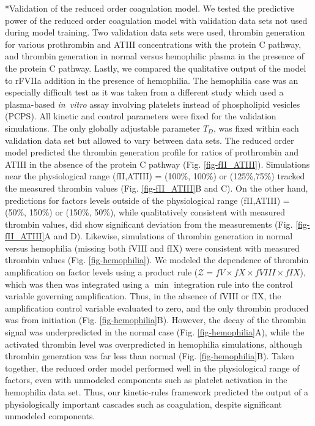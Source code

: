 \documentclass[12pt]{article}
\makeatletter
\renewcommand\subsection{\@startsection
	{subsection}{2}{0mm}
	{-0.05in}
	{-0.5\baselineskip}
	{\normalfont\normalsize\bfseries}}
\makeatother
\begin{document}
\subsection*{Validation of the reduced order coagulation model.}
We tested the predictive power of the reduced order coagulation model with validation data sets not used during model training. 
Two validation data sets were used, thrombin generation for various prothrombin and ATIII concentrations with the protein C pathway, 
and thrombin generation in normal versus hemophilic plasma in the presence of the protein C pathway. 
Lastly, we compared the qualitative output of the model to rFVIIa addition in the presence of hemophilia.
The hemophilia case was an especially difficult test as it was taken from a different study which used a plasma-based
\textit{in~vitro} assay involving platelets instead of phospholipid vesicles (PCPS). 
All kinetic and control parameters were fixed for the validation simulations. 
The only globally adjustable parameter $T_{D}$, was fixed within each validation data set but allowed to vary between data sets.
The reduced order model predicted the thrombin generation profile for ratios of prothrombin and ATIII in the absence of the protein C pathway (Fig. \ref{fig-fII_ATIII}).
Simulations near the physiological range (fII,ATIII) = (100\%, 100\%) or (125\%,75\%) tracked the measured thrombin values (Fig. \ref{fig-fII_ATIII}B and C).
On the other hand, predictions for factors levels outside of the physiological range (fII,ATIII) = (50\%, 150\%) or (150\%, 50\%), while qualitatively consistent with measured thrombin values, did show significant 
deviation from the measurements (Fig. \ref{fig-fII_ATIII}A and D).
Likewise, simulations of thrombin generation in normal versus hemophilia (missing both fVIII and fIX) were consistent with measured thrombin values (Fig. \ref{fig-hemophilia}).
We modeled the dependence of thrombin amplification on factor levels using a product rule ($\mathcal{Z} = fV\times fX\times fVIII\times fIX$), 
which was then was integrated using a $\min$ integration rule into the control variable governing amplification. 
Thus, in the absence of fVIII or fIX, the amplification control variable evaluated to zero, and the only thrombin produced was from initiation (Fig. \ref{fig-hemophilia}B).
However, the decay of the thrombin signal was underpredicted in the normal case (Fig. \ref{fig-hemophilia}A), while the activated thrombin level was overpredicted 
in hemophilia simulations, although thrombin generation was far less than normal (Fig. \ref{fig-hemophilia}B). 
Taken together, the reduced order model performed well in the physiological range of factors, even with
unmodeled components such as platelet activation in the hemophilia data set. Thus, our kinetic-rules framework predicted 
the output of a physiologically important cascades such as coagulation, despite significant unmodeled components.
\end{document}
